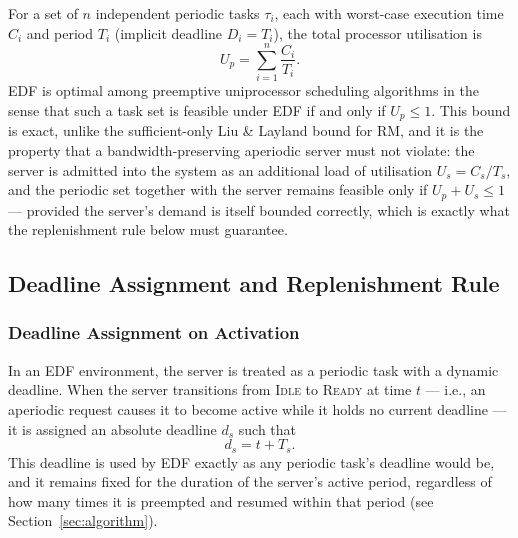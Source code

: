 \documentclass[conference]{IEEEtran}
\begin{document}
    For a set of $n$ independent periodic tasks $\tau_i$, each with worst-case execution time $C_i$ and period $T_i$ (implicit deadline $D_i = T_i$), the total processor utilisation is
    \begin{equation}
        U_p = \sum_{i=1}^{n} \frac{C_i}{T_i}.
    \end{equation}
    EDF is optimal among preemptive uniprocessor scheduling algorithms in the sense that such a task set is feasible under EDF if and only if $U_p \leq 1$. This bound is exact, unlike the sufficient-only Liu \& Layland bound for RM, and it is the property that a bandwidth-preserving aperiodic server must not violate: the server is admitted into the system as an additional load of utilisation $U_s = C_s / T_s$, and the periodic set together with the server remains feasible only if $U_p + U_s \leq 1$ — provided the server's demand is itself bounded correctly, which is exactly what the replenishment rule below must guarantee.

    \subsection{Deadline Assignment and Replenishment Rule}

    \subsubsection{Deadline Assignment on Activation}
    In an EDF environment, the server is treated as a periodic task with a dynamic deadline. When the server transitions from \textsc{Idle} to \textsc{Ready} at time $t$ — i.e., an aperiodic request causes it to become active while it holds no current deadline — it is assigned an absolute deadline $d_s$ such that
    \begin{equation}
        d_s = t + T_s.
        \label{eq:activation}
    \end{equation}
    This deadline is used by EDF exactly as any periodic task's deadline would be, and it remains fixed for the duration of the server's active period, regardless of how many times it is preempted and resumed within that period (see Section~\ref{sec:algorithm}).
\end{document}
